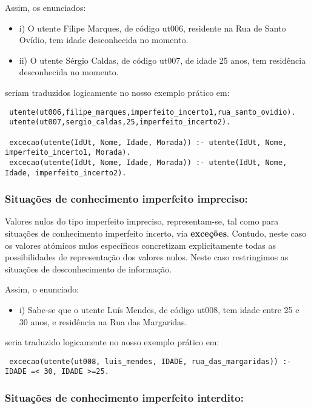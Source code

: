 \documentclass[
  oneside,
  10pt, a4paper,
  footinclude=true,
  headinclude=true,
  cleardoublepage=empty
]{scrbook}
\begin{document}
Assim, os enunciados: 
\begin{itemize}
\item i) O utente Filipe Marques, de código ut006, residente na Rua de Santo Ovídio, tem idade desconhecida no momento.
\item ii) O utente Sérgio Caldas, de código ut007, de idade 25 anos, tem residência desconhecida no momento.
\end{itemize}

seriam traduzidos logicamente  no nosso exemplo prático em:
\begin{lstlisting}
 utente(ut006,filipe_marques,imperfeito_incerto1,rua_santo_ovidio).
 utente(ut007,sergio_caldas,25,imperfeito_incerto2).
 
 excecao(utente(IdUt, Nome, Idade, Morada)) :- utente(IdUt, Nome, imperfeito_incerto1, Morada).
 excecao(utente(IdUt, Nome, Idade, Morada)) :- utente(IdUt, Nome, Idade, imperfeito_incerto2).
\end{lstlisting}

\subsubsection{\textbf{Situações de conhecimento imperfeito impreciso:}}


        
        
Valores nulos do tipo imperfeito impreciso, representam-se, tal como para situações de conhecimento imperfeito incerto, via \textbf{exceções}. Contudo, neste caso os valores atómicos nulos específicos concretizam explicitamente todas as possibilidades de representação dos valores nulos. Neste caso restringimos as situações de desconhecimento de informação.\par 


Assim, o enunciado: 
\begin{itemize}
\item i) Sabe-se que o utente Luís Mendes, de código ut008, tem idade entre 25 e 30 anos, e residência na Rua das Margaridas.
\end{itemize}

seria traduzido logicamente  no nosso exemplo prático em:
\begin{lstlisting}
 excecao(utente(ut008, luis_mendes, IDADE, rua_das_margaridas)) :- IDADE =< 30, IDADE >=25.
\end{lstlisting}

\subsubsection{\textbf{Situações de conhecimento imperfeito interdito:}}
\end{document}

